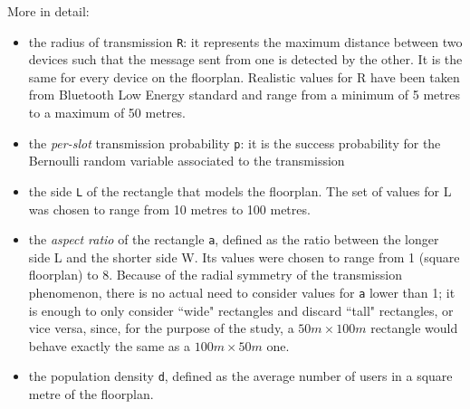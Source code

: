 More in detail:
\begin{itemize}
	\item
	the radius of transmission \colorbox{gray!30}{\large \texttt{R}}: it represents the maximum distance between two devices such that the message sent from one is detected by the other. It is the same for every device on the floorplan. Realistic values for R have been taken from Bluetooth Low Energy standard and range from a minimum of 5 metres to a maximum of 50 metres.
	\item
	the \textit{per-slot} transmission probability \colorbox{gray!30}{\large \texttt{p}}: it is the success probability for the Bernoulli random variable associated to the transmission
	 \item
	 the side \colorbox{gray!30}{\large \texttt{L}} of the rectangle that models the floorplan. The set of values for L was chosen to range from 10 metres to 100 metres.
	 \item
	 the \textit{aspect ratio} of the rectangle \colorbox{gray!30}{\large \texttt{a}}, defined as the ratio between the longer side L and the shorter side W. Its values were chosen to range from 1 (square floorplan) to 8. Because of the radial symmetry of the transmission phenomenon, there is no actual need to consider values for \texttt{a} lower than 1; it is enough to only consider ``wide" rectangles and discard ``tall" rectangles, or vice versa, since, for the purpose of the study, a $50m \times 100m$ rectangle would behave exactly the same as a $100m \times 50m$ one.
	 \item
	 the population density \colorbox{gray!30}{\large \texttt{d}}, defined as the average number of users in a square metre of the floorplan.
\end{itemize}

